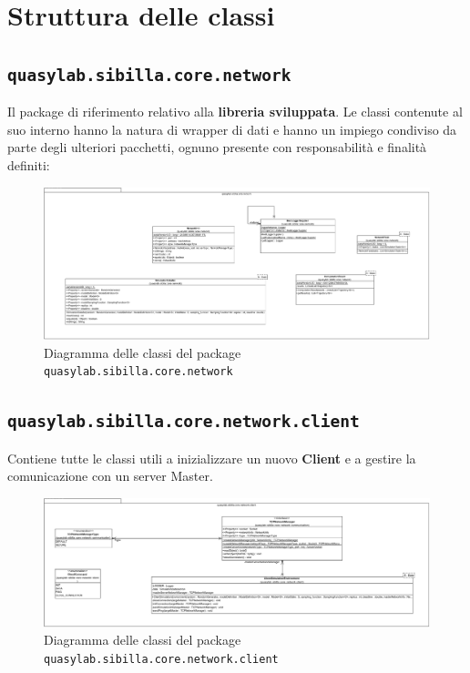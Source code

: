 

\section{Struttura delle classi}

\subsection{\texttt{quasylab.sibilla.core.network}}
Il package di riferimento relativo alla \textbf{libreria sviluppata}. Le classi contenute al suo interno hanno la natura di wrapper di dati e hanno un impiego condiviso da parte degli ulteriori pacchetti, ognuno presente con responsabilità e finalità definiti:

\begin{figure}[H]
  \includegraphics[width=\linewidth]{images/quasylab.sibilla.core.network.png}
  \captionsetup{justification=centering}
  \caption{Diagramma delle classi del package \texttt{quasylab.sibilla.core.network}}
\end{figure}

\subsection{\texttt{quasylab.sibilla.core.network.client}} Contiene tutte le classi utili a inizializzare un nuovo \textbf{Client} e a gestire la comunicazione con un server Master.

\begin{figure}[H]
    \includegraphics[width=\linewidth]{images/quasylab.sibilla.core.network.client.png}
    \captionsetup{justification=centering}
    \caption{Diagramma delle classi del package \texttt{quasylab.sibilla.core.network.client}}
  \end{figure}

